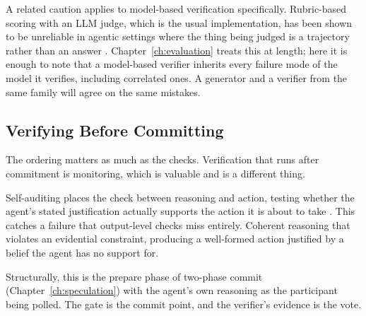 A related caution applies to model-based verification specifically. Rubric-based
scoring with an LLM judge, which is the usual implementation, has been shown to be
unreliable in agentic settings where the thing being judged is a trajectory rather
than an answer \cite{judgerubric2026}. Chapter~\ref{ch:evaluation} treats this at
length; here it is enough to note that a model-based verifier inherits every
failure mode of the model it verifies, including correlated ones. A generator and
a verifier from the same family will agree on the same mistakes.

\subsection{Verifying Before Committing}

The ordering matters as much as the checks. Verification that runs after
commitment is monitoring, which is valuable and is a different thing.

Self-auditing places the check between reasoning and action, testing whether the
agent's stated justification actually supports the action it is about to take
\cite{verifycommit2026}. This catches a failure that output-level checks miss
entirely. Coherent reasoning that violates an evidential constraint, producing a
well-formed action justified by a belief the agent has no support for.

Structurally, this is the prepare phase of two-phase commit
(Chapter~\ref{ch:speculation}) with the agent's own reasoning as the participant
being polled. The gate is the commit point, and the verifier's evidence is the
vote.

